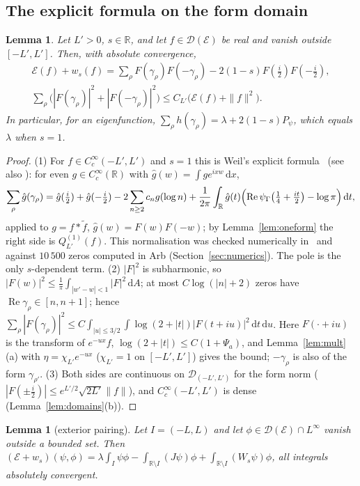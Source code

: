 \documentclass[11pt]{amsart}
\newcommand{\R}{\mathbb{R}}
\newcommand{\cE}{\mathcal{E}}
\newcommand{\dd}{\,\mathrm{d}}
\newcommand{\dig}{\psi_\Gamma}
\DeclareMathOperator{\re}{Re}
\newtheorem{lemma}[theorem]{Lemma}
\theoremstyle{definition}
\theoremstyle{remark}
\numberwithin{equation}{section}
\begin{document}
\subsection{The explicit formula on the form domain}

\begin{lemma}\label{lem:EF}
Let $L'>0$, $s\in\R$, and let $f\in \mathcal D(\cE)$ be real and vanish outside $[-L',L']$. Then, with absolute convergence,
\begin{gather*}
\cE(f)+w_s(f)=\sum_\rho F(\gamma_\rho)F(-\gamma_\rho)-2(1-s)F(\tfrac i2)F(-\tfrac i2),\\
\sum_\rho\bigl(|F(\gamma_\rho)|^2+|F(-\gamma_\rho)|^2\bigr)\le C_{L'}\bigl(\cE(f)+\|f\|^2\bigr).
\end{gather*}
In particular, for an eigenfunction, $\sum_\rho h(\gamma_\rho)=\lambda+2(1-s)P_\psi$, which equals $\lambda$ when $s=1$.
\end{lemma}

\begin{proof}
(1) For $f\in C_c^\infty(-L',L')$ and $s=1$ this is Weil's explicit formula~\cite{Wei52} (see also \cite[\S5.5]{IK04}): for even $g\in C_c^\infty(\R)$ with $\hat g(w)=\int ge^{ixw}\dd x$,
\[
\sum_\rho\hat g(\gamma_\rho)=\hat g(\tfrac i2)+\hat g(-\tfrac i2)-2\sum_{n\ge2}c_ng(\log n)+\frac1{2\pi}\int_\R\hat g(t)\Bigl(\re\dig\bigl(\tfrac14+\tfrac{it}2\bigr)-\log\pi\Bigr)\dd t,
\]
applied to $g=f*\tilde f$, $\hat g(w)=F(w)F(-w)$; by Lemma~\ref{lem:oneform} the right side is $Q^{(1)}_{L'}(f)$. This normalisation was checked numerically in~\cite{GS} and against $10\,500$ zeros computed in Arb (Section~\ref{sec:numerics}). The pole is the only $s$-dependent term. (2) $|F|^2$ is subharmonic, so $|F(w)|^2\le\frac1\pi\int_{|w'-w|<1}|F|^2\dd A$; at most $C\log(|n|+2)$ zeros have $\re\gamma_\rho\in[n,n+1]$; hence $\sum_\rho|F(\gamma_\rho)|^2\le C\int_{|u|\le3/2}\int\log(2+|t|)|F(t+iu)|^2\dd t\dd u$. Here $F(\cdot+iu)$ is the transform of $e^{-ux}f$, $\log(2+|t|)\le C(1+\Psi_a)$, and Lemma~\ref{lem:mult}(a) with $\eta=\chi_{L'}e^{-ux}$ ($\chi_{L'}=1$ on $[-L',L']$) gives the bound; $-\gamma_\rho$ is also of the form $\gamma_{\rho'}$. (3) Both sides are continuous on $\mathcal D_{(-L',L')}$ for the form norm ($|F(\pm\frac i2)|\le e^{L'/2}\sqrt{2L'}\|f\|$), and $C_c^\infty(-L',L')$ is dense (Lemma~\ref{lem:domains}(b)).
\end{proof}

\begin{lemma}[exterior pairing]\label{lem:extpair}
Let $I=(-L,L)$ and let $\phi\in \mathcal D(\cE)\cap L^\infty$ vanish outside a bounded set. Then $(\cE+w_s)(\psi,\phi)=\lambda\int_I\psi\phi-\int_{\R\setminus I}(J\psi)\phi+\int_{\R\setminus I}(W_s\psi)\phi$, all integrals absolutely convergent.
\end{lemma}
\end{document}
